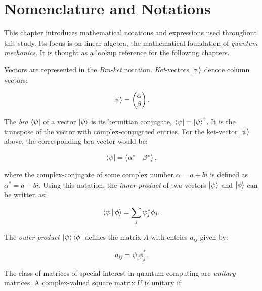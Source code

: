 \chapter{Nomenclature and Notations}

This chapter introduces mathematical notations and expressions used throughout 
this study. Its focus is on linear algebra, the mathematical foundation of 
\textit{quantum mechanics}. It is thought as a lookup reference for the following chapters.

Vectors are represented in the \textit{Bra-ket} notation. \textit{Ket}-vectors $\Ket{\psi}$ denote 
column vectors:

\begin{equation}
   \Ket{\psi} = \begin{pmatrix} \alpha \\ \beta \end{pmatrix}.
\end{equation}

The \textit{bra} $\Bra{\psi}$ of a vector $\Ket{\psi}$ is its hermitian conjugate, 
$\Bra{\psi} = \Ket{\psi}^{\dagger}$. It is the transpose of the vector with complex-conjugated 
entries. For the ket-vector $\Ket{\psi}$ above, the corresponding bra-vector would be:

\begin{equation}
   \Bra{\psi} = \begin{pmatrix}
      \alpha^* & \beta^*
   \end{pmatrix},
\end{equation}

where the complex-conjugate of some complex number $\alpha = a + b i$ is 
defined as $\alpha^* = a - b i$. Using this notation, the \textit{inner product} of two vectors
$\Ket{\psi}$ and $\Ket{\phi}$ can be written as:

\begin{equation}
   \Braket{\psi | \phi} = \sum_j \psi_j^* \phi_j.
\end{equation}

The \textit{outer product} $\Ket{\psi} \Bra{\phi}$ defines the matrix $A$ with entries 
$a_{ij}$ given by:

\begin{equation}
   a_{ij} = \psi_i \phi^*_j.
\end{equation}

The class of matrices of special interest in quantum computing are \textit{unitary} matrices.
A complex-valued square matrix $U$ is unitary if:

